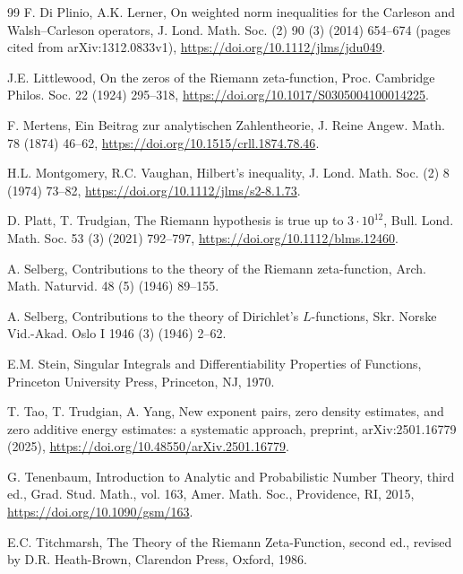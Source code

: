 \documentclass[preprint,12pt]{elsarticle}
\numberwithin{equation}{section}
\theoremstyle{plain}
\theoremstyle{definition}
\theoremstyle{remark}
\begin{document}
\begin{thebibliography}{99}
F. Di Plinio, A.K. Lerner, On weighted norm inequalities for the Carleson and Walsh--Carleson operators, J. Lond. Math. Soc. (2) 90 (3) (2014) 654--674 (pages cited from arXiv:1312.0833v1), \href{https://doi.org/10.1112/jlms/jdu049}{https://doi.org/10.1112/jlms/jdu049}.

J.E. Littlewood, On the zeros of the Riemann zeta-function, Proc. Cambridge Philos. Soc. 22 (1924) 295--318, \href{https://doi.org/10.1017/S0305004100014225}{https://doi.org/10.1017/S0305004100014225}.

F. Mertens, Ein Beitrag zur analytischen Zahlentheorie, J. Reine Angew. Math. 78 (1874) 46--62, \href{https://doi.org/10.1515/crll.1874.78.46}{https://doi.org/10.1515/crll.1874.78.46}.

H.L. Montgomery, R.C. Vaughan, Hilbert's inequality, J. Lond. Math. Soc. (2) 8 (1974) 73--82, \href{https://doi.org/10.1112/jlms/s2-8.1.73}{https://doi.org/10.1112/jlms/s2-8.1.73}.

D. Platt, T. Trudgian, The Riemann hypothesis is true up to $3\cdot10^{12}$, Bull. Lond. Math. Soc. 53 (3) (2021) 792--797, \href{https://doi.org/10.1112/blms.12460}{https://doi.org/10.1112/blms.12460}.

A. Selberg, Contributions to the theory of the Riemann zeta-function, Arch. Math. Naturvid. 48 (5) (1946) 89--155.

A. Selberg, Contributions to the theory of Dirichlet's $L$-functions, Skr. Norske Vid.-Akad. Oslo I 1946 (3) (1946) 2--62.

E.M. Stein, Singular Integrals and Differentiability Properties of Functions, Princeton University Press, Princeton, NJ, 1970.

T. Tao, T. Trudgian, A. Yang, New exponent pairs, zero density estimates, and zero additive energy estimates: a systematic approach, preprint, arXiv:2501.16779 (2025), \href{https://doi.org/10.48550/arXiv.2501.16779}{https://doi.org/10.48550/arXiv.2501.16779}.

G. Tenenbaum, Introduction to Analytic and Probabilistic Number Theory, third ed., Grad. Stud. Math., vol. 163, Amer. Math. Soc., Providence, RI, 2015, \href{https://doi.org/10.1090/gsm/163}{https://doi.org/10.1090/gsm/163}.

E.C. Titchmarsh, The Theory of the Riemann Zeta-Function, second ed., revised by D.R. Heath-Brown, Clarendon Press, Oxford, 1986.


\end{thebibliography}
\end{document}
